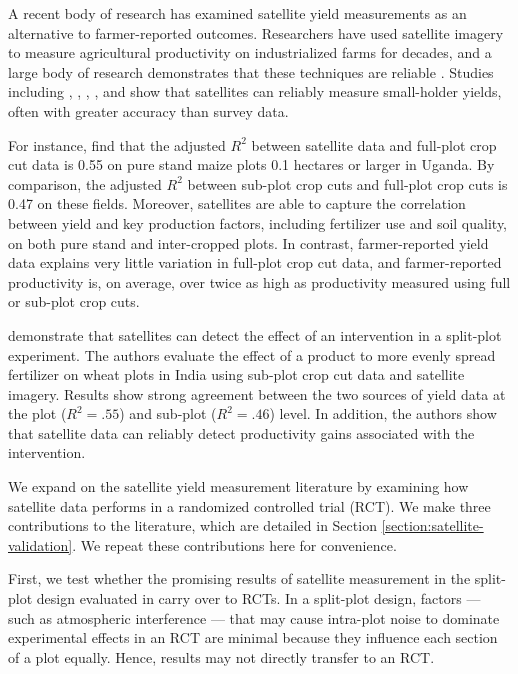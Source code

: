 \documentclass{article}
\begin{document}
A recent body of research has examined satellite yield measurements as an alternative to farmer-reported outcomes. Researchers have used satellite imagery to measure agricultural productivity on industrialized  farms for decades, and a large body of research demonstrates that these techniques are reliable \citep{Lobell2013}. Studies including \citet{Jain2016MappingData}, \citet{Burke2017Satellite-basedSystems}, \citet{Lambert2018EstimatingBelt}, \citet{Lobell2019EyesAnalysis}, and \citet{Lobell2019SightMali} show that satellites can reliably measure small-holder yields, often with greater accuracy than survey data. 

For instance, \citet{Lobell2019EyesAnalysis} find that the adjusted $R^2$ between satellite data and full-plot crop cut data is 0.55 on pure stand maize plots 0.1 hectares or larger in Uganda. By comparison, the adjusted $R^2$ between sub-plot crop cuts and full-plot crop cuts is 0.47 on these fields. Moreover, satellites are able to capture the correlation between yield and key production factors, including fertilizer use and soil quality, on both pure stand and inter-cropped plots. In contrast, farmer-reported yield data explains very little variation in full-plot crop cut data, and farmer-reported productivity is, on average, over twice as high as productivity measured using full or sub-plot crop cuts. 

\citet{Jain2019TheData} demonstrate that satellites can detect the effect of an intervention in a split-plot experiment. The authors evaluate the effect of a product to more evenly spread fertilizer on wheat plots in India using sub-plot crop cut data and satellite imagery. Results show strong agreement between the two sources of yield data at the plot ($R^2=.55$) and sub-plot ($R^2=.46$) level. In addition, the authors show that satellite data can reliably detect productivity gains associated with the intervention. 

We expand on the satellite yield measurement literature by examining how satellite data performs in a randomized controlled trial (RCT). We make three contributions to the literature, which are detailed in Section \ref{section:satellite-validation}. We repeat these contributions here for convenience.  

First, we test whether the promising results of satellite measurement in the split-plot design evaluated in \citet{Jain2019TheData} carry over to RCTs. In a split-plot design, factors — such as atmospheric interference — that may cause intra-plot noise to dominate experimental effects in an RCT are minimal because they influence each section of a plot equally. Hence, results may not directly transfer to an RCT. 
\end{document}
